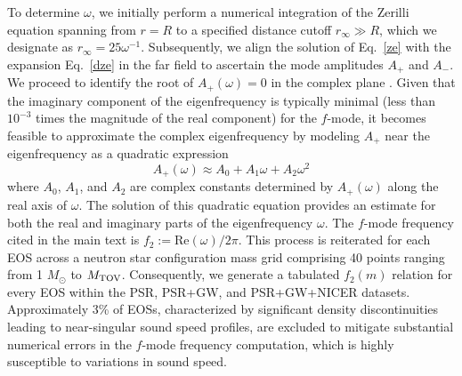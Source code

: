 \documentclass[aps,prd,twocolumn,superscriptaddress,footinbib]{revtex4-1}
\begin{document}
To determine $\omega$, we initially perform a numerical integration of the Zerilli equation spanning from $r=R$ to a specified distance cutoff $r_\infty \gg R$, which we designate as $r_\infty = 25\omega^{-1}$. Subsequently, we align the solution of Eq.~\eqref{ze} with the expansion Eq.~\eqref{dze} in the far field to ascertain the mode amplitudes $A_{+}$ and $A_{-}$. We proceed to identify the root of $A_{+}(\omega)=0$ in the complex plane \cite{lindblom1983quadrupole}. Given that the imaginary component of the eigenfrequency is typically minimal (less than $10^{-3}$ times the magnitude of the real component) for the $f$-mode, it becomes feasible to approximate the complex eigenfrequency by modeling $A_{+}$ near the eigenfrequency as a quadratic expression
\begin{equation}
    A_{+}(\omega) \approx A_0+A_1 \omega+A_2 \omega^2
\end{equation}
where $A_0$, $A_1$, and $A_2$ are complex constants determined by $A_{+}(\omega)$ along the real axis of $\omega$. The solution of this quadratic equation provides an estimate for both the real and imaginary parts of the eigenfrequency $\omega$. The $f$-mode frequency cited in the main text is $f_2 := \mathrm{Re}(\omega)/2\pi$. This process is reiterated for each EOS across a neutron star configuration mass grid comprising 40 points ranging from 1 $M_\odot$ to $M_{\rm TOV}$. Consequently, we generate a tabulated $f_2(m)$ relation for every EOS within the PSR, PSR+GW, and PSR+GW+NICER datasets. Approximately 3\% of EOSs, characterized by significant density discontinuities leading to near-singular sound speed profiles, are excluded to mitigate substantial numerical errors in the $f$-mode frequency computation, which is highly susceptible to variations in sound speed.
\end{document}

